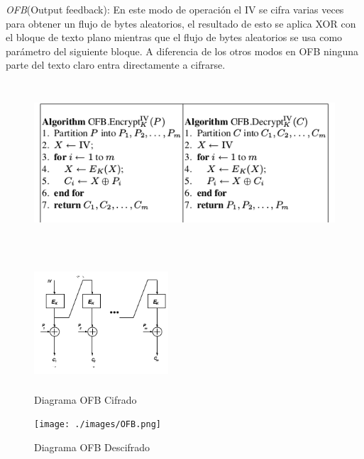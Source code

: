 \documentclass[12pt,oneside,onecolumn,openany]{report}
\begin{document}
\textit{OFB}(Output feedback): En este modo de operación el IV se cifra varias veces para obtener un flujo de bytes aleatorios, el resultado de esto se aplica XOR con el bloque de texto plano mientras que el flujo de bytes aleatorios se usa como parámetro del siguiente bloque. A diferencia de los otros modos en OFB ninguna parte del texto claro entra directamente a cifrarse.
\begin{figure}[H]
\centering
	\includegraphics[width=14cm, height=6cm]{./images/pofb.png}
	
\end{figure}
\begin{figure}[H]
\centering
	\includegraphics[width=5cm, height=5cm]{./images/ofb1.png}
	\caption{Diagrama OFB Cifrado}
	\label{fig:1-6-1}
\end{figure}
\begin{figure}[H]
\centering
	\texttt{[image: ./images/OFB.png]}
	\caption{Diagrama OFB Descifrado}
	\label{fig:1-6-1}
\end{figure}
\end{document}
